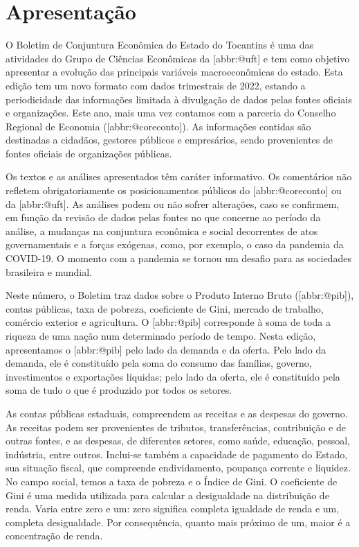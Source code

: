 \documentclass[
]{article}
\author{}
\date{\vspace{-2.5em}}
\begin{document}
\hypertarget{apresentauxe7uxe3o}{%
\section*{Apresentação}\label{apresentauxe7uxe3o}}

\begin{center}

\begin{minipage}{.7\linewidth}
O Boletim de Conjuntura Econômica do Estado do Tocantins é uma das
atividades do Grupo  de Ciências Econômicas da {[}abbr:@uft{]}
e tem como objetivo apresentar a evolução das principais variáveis
macroeconômicas do estado. Esta edição tem um novo formato com dados
trimestrais de 2022, estando a periodicidade das informações limitada à
divulgação de dados pelas fontes oficiais e organizações. Este ano, mais
uma vez contamos com a parceria do Conselho Regional de Economia
({[}abbr:@coreconto{]}). As informações contidas são destinadas a
cidadãos, gestores públicos e empresários, sendo provenientes de fontes
oficiais de organizações públicas.

Os textos e as análises apresentados têm caráter informativo. Os
comentários não refletem obrigatoriamente os posicionamentos públicos do
{[}abbr:@coreconto{]} ou da {[}abbr:@uft{]}. As análises podem ou não
sofrer alterações, caso se confirmem, em função da revisão de dados
pelas fontes no que concerne ao período da análise, a mudanças na
conjuntura econômica e social decorrentes de atos governamentais e a
forças exógenas, como, por exemplo, o caso da pandemia da COVID-19. O
momento com a pandemia se tornou um desafio para as sociedades
brasileira e mundial.

Neste número, o Boletim traz dados sobre o Produto Interno Bruto
({[}abbr:@pib{]}), contas públicas, taxa de pobreza, coeficiente de
Gini, mercado de trabalho, comércio exterior e agricultura. O
{[}abbr:@pib{]} corresponde à soma de toda a riqueza de uma nação num
determinado período de tempo. Nesta edição, apresentamos o
{[}abbr:@pib{]} pelo lado da demanda e da oferta. Pelo lado da demanda,
ele é constituído pela soma do consumo das famílias, governo,
investimentos e exportações líquidas; pelo lado da oferta, ele é
constituído pela soma de tudo o que é produzido por todos os setores.

As contas públicas estaduais, compreendem as receitas e as despesas do
governo. As receitas podem ser provenientes de tributos, transferências,
contribuição e de outras fontes, e as despesas, de diferentes setores,
como saúde, educação, pessoal, indústria, entre outros. Inclui-se também
a capacidade de pagamento do Estado, sua situação fiscal, que compreende
endividamento, poupança corrente e liquidez. No campo social, temos a
taxa de pobreza e o Índice de Gini. O coeficiente de Gini é uma medida
utilizada para calcular a desigualdade na distribuição de renda. Varia
entre zero e um: zero significa completa igualdade de renda e um,
completa desigualdade. Por consequência, quanto mais próximo de um,
maior é a concentração de renda.


\end{minipage}
\end{center}
\end{document}
